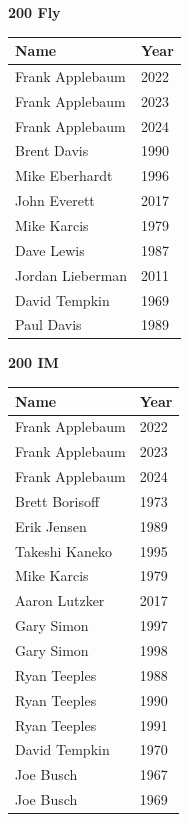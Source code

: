 \vspace{1.2em}
\noindent\begin{minipage}[t]{0.48\textwidth}
\centering
\textbf{\textcolor{teamprimary}{200 Fly}}\par
\vspace{0.5em}
\centering
\small
\renewcommand{\arraystretch}{1.0}
\setlength{\tabcolsep}{4pt}
\begin{tabular}{@{}p{3.0cm}p{1.0cm}@{}}
\toprule
\textbf{Name} & \textbf{Year} \\
\midrule
Frank Applebaum & 2022 \\
Frank Applebaum & 2023 \\
Frank Applebaum & 2024 \\
Brent Davis & 1990 \\
Mike Eberhardt & 1996 \\
John Everett & 2017 \\
Mike Karcis & 1979 \\
Dave Lewis & 1987 \\
Jordan Lieberman & 2011 \\
David Tempkin & 1969 \\
Paul Davis & 1989 \\
\bottomrule
\end{tabular}
\end{minipage}
\hfill
\begin{minipage}[t]{0.48\textwidth}
\centering
\textbf{\textcolor{teamprimary}{200 IM}}\par
\vspace{0.5em}
\centering
\small
\renewcommand{\arraystretch}{1.0}
\setlength{\tabcolsep}{4pt}
\begin{tabular}{@{}p{3.0cm}p{1.0cm}@{}}
\toprule
\textbf{Name} & \textbf{Year} \\
\midrule
Frank Applebaum & 2022 \\
Frank Applebaum & 2023 \\
Frank Applebaum & 2024 \\
Brett Borisoff & 1973 \\
Erik Jensen & 1989 \\
Takeshi Kaneko & 1995 \\
Mike Karcis & 1979 \\
Aaron Lutzker & 2017 \\
Gary Simon & 1997 \\
Gary Simon & 1998 \\
Ryan Teeples & 1988 \\
Ryan Teeples & 1990 \\
Ryan Teeples & 1991 \\
David Tempkin & 1970 \\
Joe Busch & 1967 \\
Joe Busch & 1969 \\
\bottomrule
\end{tabular}
\end{minipage}
